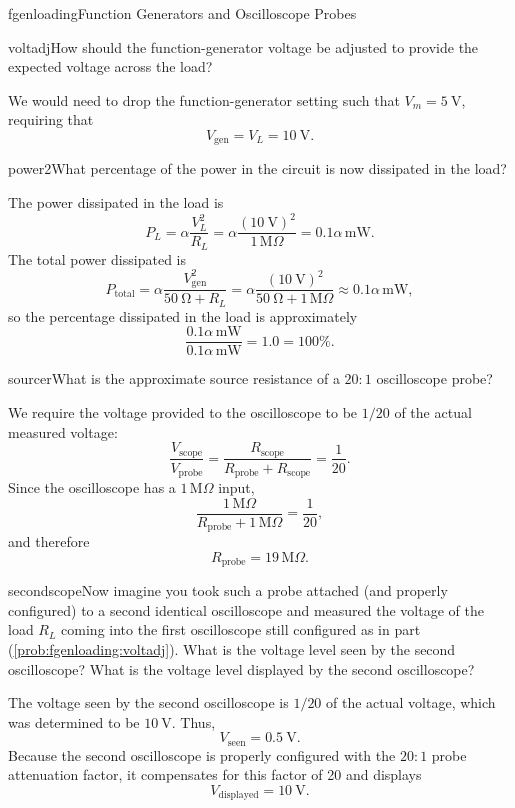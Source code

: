 \begin{mainquestion}{fgenloading}{Function Generators and Oscilloscope Probes}
\begin{partquestion}{voltadj}{How should the function-generator voltage be adjusted to provide the expected voltage across the load?}
\begin{answer}
We would need to drop the function-generator setting such that $V_m = \qty{5}{\volt}$, requiring that
\[
V_{\mathrm{gen}}=V_L=\qty{10}{\volt}.
\]
\end{answer}
\end{partquestion}
\begin{partquestion}{power2}{What percentage of the power in the circuit is now dissipated in the load?}
\begin{answer}
The power dissipated in the load is
\[
P_L=\alpha\frac{V_L^2}{R_L}
=\alpha\frac{(\qty{10}{\volt})^2}{1\,\mathrm{M}\Omega}
=0.1\alpha\,\mathrm{mW}.
\]
The total power dissipated is
\[
P_{\mathrm{total}}
=\alpha\frac{V_{\mathrm{gen}}^2}{\qty{50}{\ohm}+R_L}
=\alpha\frac{(\qty{10}{\volt})^2}{\qty{50}{\ohm}+1\,\mathrm{M}\Omega}
\approx 0.1\alpha\,\mathrm{mW},
\]
so the percentage dissipated in the load is approximately
\[
\frac{0.1\alpha\,\mathrm{mW}}{0.1\alpha\,\mathrm{mW}}
=1.0=100\%.
\]
\end{answer}
\end{partquestion}
\begin{partquestion}{sourcer}{What is the approximate source resistance of a $20{:}1$
oscilloscope probe?}
\begin{answer}
We require the voltage provided to the oscilloscope to be $1/20$ of the actual measured
voltage:
\[
\frac{V_{\mathrm{scope}}}{V_{\mathrm{probe}}}
=\frac{R_{\mathrm{scope}}}{R_{\mathrm{probe}}+R_{\mathrm{scope}}}
=\frac{1}{20}.
\]
Since the oscilloscope has a $1\,\mathrm{M}\Omega$ input,
\[
\frac{1\,\mathrm{M}\Omega}{R_{\mathrm{probe}}+1\,\mathrm{M}\Omega}
=\frac{1}{20},
\]
and therefore
\[
R_{\mathrm{probe}}=19\,\mathrm{M}\Omega.
\]
\end{answer}
\end{partquestion}
\begin{partquestion}{secondscope}{Now imagine you took such a probe attached (and properly configured)
to a second identical oscilloscope and measured the voltage of the load $R_L$ coming into
the first oscilloscope still configured as in part (\cref{prob:fgenloading:voltadj}). What is the voltage level seen by
the second oscilloscope? What is the voltage level displayed by the second oscilloscope?}
\begin{answer}
The voltage seen by the second oscilloscope is $1/20$ of the actual voltage, which was
determined to be $\qty{10}{\volt}$. Thus,
\[
V_{\mathrm{seen}}=\qty{0.5}{\volt}.
\]
Because the second oscilloscope is properly configured with the $20{:}1$ probe attenuation
factor, it compensates for this factor of 20 and displays
\[
V_{\mathrm{displayed}}=\qty{10}{\volt}.
\]
\end{answer}
\end{partquestion}

\end{mainquestion}


